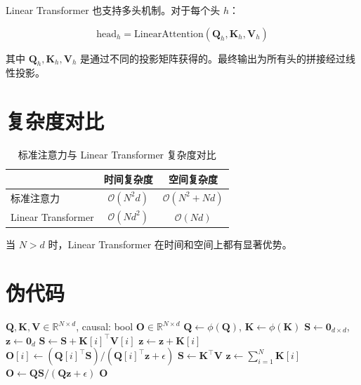 Linear Transformer 也支持多头机制。对于每个头 $h$：

\begin{equation}
    \text{head}_h = \text{LinearAttention}(\mathbf{Q}_h, \mathbf{K}_h, \mathbf{V}_h)
\end{equation}

其中 $\mathbf{Q}_h, \mathbf{K}_h, \mathbf{V}_h$ 是通过不同的投影矩阵获得的。最终输出为所有头的拼接经过线性投影。

\section{复杂度对比}

\begin{table}[H]
    \centering
    \begin{tabular}{l|cc}
        \toprule
        & 时间复杂度 & 空间复杂度 \\
        \midrule
        标准注意力 & $\mathcal{O}(N^2 d)$ & $\mathcal{O}(N^2 + Nd)$ \\
        Linear Transformer & $\mathcal{O}(Nd^2)$ & $\mathcal{O}(Nd)$ \\
        \bottomrule
    \end{tabular}
    \caption{标准注意力与 Linear Transformer 复杂度对比}
\end{table}

当 $N > d$ 时，Linear Transformer 在时间和空间上都有显著优势。

\section{伪代码}

\begin{algorithm}[H]
    \caption{Linear Transformer 前向传播}
    \begin{algorithmic}[1]
        \Require $\mathbf{Q}, \mathbf{K}, \mathbf{V} \in \mathbb{R}^{N \times d}$, causal: bool
        \Ensure $\mathbf{O} \in \mathbb{R}^{N \times d}$
        \State $\mathbf{Q} \gets \phi(\mathbf{Q})$, $\mathbf{K} \gets \phi(\mathbf{K})$
            \State $\mathbf{S} \gets \mathbf{0}_{d \times d}$, $\mathbf{z} \gets \mathbf{0}_d$
                \State $\mathbf{S} \gets \mathbf{S} + \mathbf{K}[i]^\top \mathbf{V}[i]$
                \State $\mathbf{z} \gets \mathbf{z} + \mathbf{K}[i]$
                \State $\mathbf{O}[i] \gets (\mathbf{Q}[i]^\top \mathbf{S}) / (\mathbf{Q}[i]^\top \mathbf{z} + \epsilon)$
            \EndFor
        \Else
            \State $\mathbf{S} \gets \mathbf{K}^\top \mathbf{V}$
            \State $\mathbf{z} \gets \sum_{i=1}^N \mathbf{K}[i]$
            \State $\mathbf{O} \gets \mathbf{Q} \mathbf{S} / (\mathbf{Q} \mathbf{z} + \epsilon)$
        \EndIf
        \State \Return $\mathbf{O}$
    \end{algorithmic}
\end{algorithm}
